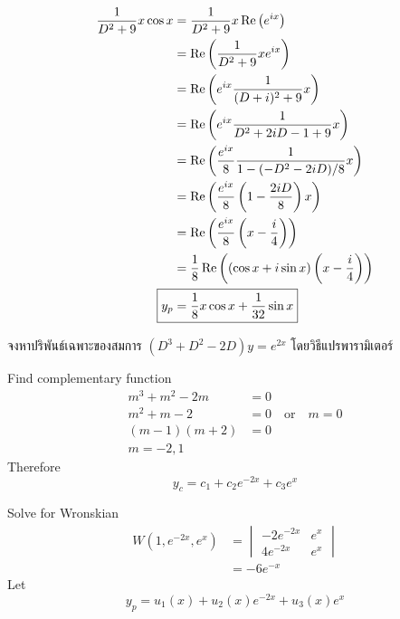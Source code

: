 \documentclass[12pt,final]{novelette} %
\begin{document}
\begin{question}[resume]
    \vspace*{-1em}
    \begin{align*}
        \frac{1}{D^2+9} x \cos x & = \frac{1}{D^2+9} x \Re\left(e^{ix}\right)                                \\
                                 & = \Re\left(\frac{1}{D^2+9} x e^{ix}\right)                                \\
                                 & = \Re\left(e^{ix} \frac{1}{(D+i)^2+9} x\right)                            \\
                                 & = \Re\left(e^{ix} \frac{1}{D^2+2iD-1+9} x\right)                          \\
                                 & = \Re\left(\frac{e^{ix}}8 \frac{1}{1-(-D^2-2iD)/8} x\right)               \\
                                 & = \Re\left(\frac{e^{ix}}8 \left(1-\frac{2iD}{8}\right) x\right)           \\
                                 & = \Re\left(\frac{e^{ix}}8 \left(x - \frac{i}{4}\right)\right)             \\
                                 & = \frac18 \Re\left((\cos x + i \sin x)\left(x - \frac{i}{4}\right)\right) \\
        \Aboxed{y_p              & = \frac18 x \cos x + \frac1{32} \sin x}
    \end{align*}

    \pagebreak

    \item {}
    จงหาปริพันธ์เฉพาะของสมการ $(D^3 + D^2 - 2D)y = e^{2x}$ โดยวิธีแปรพารามิเตอร์ 

    \bigskip
    Find complementary function
    \begin{align*}
        m^3 + m^2 - 2m & = 0                             \\
        m^2 + m - 2    & = 0 \quad \text{or} \quad m = 0 \\
        (m-1)(m+2)     & = 0                             \\
        m = -2, 1
    \end{align*}
    Therefore
    $$
        y_c = c_1 + c_2 e^{-2x} + c_3 e^x
    $$

    Solve for Wronskian
    \begin{align*}
        W(1,e^{-2x},e^x) & =
        \begin{vmatrix}
            -2e^{-2x} & e^x \\
            4e^{-2x}  & e^x
        \end{vmatrix}                \\
                         & = -6 e^{-x}
    \end{align*}
    Let
    $$
        y_p = u_1(x) + u_2(x) e^{-2x} + u_3(x) e^x
    $$


\end{question}
\end{document}
